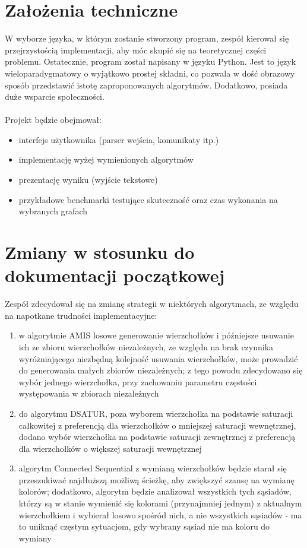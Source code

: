 \documentclass[10pt,a4paper]{article}
\begin{document}
	\section{Założenia techniczne}
	
	W wyborze języka, w którym zostanie stworzony program, zespół kierował się przejrzystością implementacji, aby móc skupić się na teoretycznej części problemu. Ostatecznie, program został napisany w języku Python. Jest to język wieloparadygmatowy o wyjątkowo prostej składni, co pozwala w dość obrazowy sposób przedstawić istotę zaproponowanych algorytmów. Dodatkowo, posiada duże wsparcie społeczności. 
	\\~\\
	Projekt będzie obejmował:
	\begin{itemize}
		\item interfejs użytkownika (parser wejścia, komunikaty itp.)
		\item implementację wyżej wymienionych algorytmów 
		\item prezentację wyniku (wyjście tekstowe)
		\item przykładowe benchmarki testujące skuteczność oraz czas wykonania na wybranych grafach
	\end{itemize}

	\section{Zmiany w stosunku do dokumentacji początkowej}
	
	Zespół zdecydował się na zmianę strategii w niektórych algorytmach, ze względu na napotkane trudności implementacyjne:
	\begin{enumerate}
		\item w algorytmie AMIS losowe generowanie wierzchołków i późniejsze usuwanie ich ze zbioru wierzchołków niezależnych, ze względu na brak czynnika wyróżniającego niezbędną kolejność usuwania wierzchołków, może prowadzić do generowania małych zbiorów niezależnych; z tego powodu zdecydowano się wybór jednego wierzchołka, przy zachowaniu parametru częstości występowania w zbiorach niezależnych
		\item do algorytmu DSATUR, poza wyborem wierzchołka na podstawie saturacji całkowitej z preferencją dla wierzchołków o mniejszej saturacji wewnętrznej, dodano wybór wierzchołka na podstawie saturacji zewnętrznej z preferencją dla wierzchołków o większej saturacji wewnętrznej
		\item algorytm Connected Sequential z wymianą wierzchołków będzie starał się przeszukiwać najdłuższą możliwą ścieżkę, aby zwiększyć szansę na wymianę kolorów; dodatkowo, algorytm będzie analizował wszystkich tych sąsiadów, którzy są w stanie wymienić się kolorami (przynajmniej jednym) z aktualnym wierzchołkiem i wybierał losowo spośród nich, a nie wszystkich sąsiadów - ma to uniknąć częstym sytuacjom, gdy wybrany sąsiad nie ma koloru do wymiany
	\end{enumerate}
	
\end{document}
